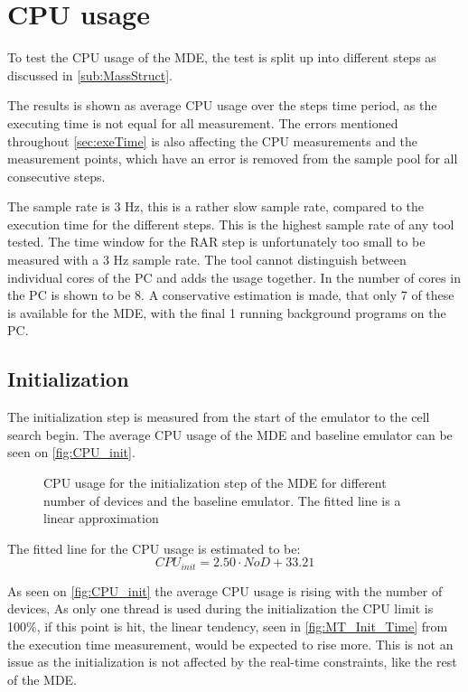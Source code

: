 \section{CPU usage}
To test the CPU usage of the MDE, the test is split up into different steps as discussed in \autoref{sub:MassStruct}. 

The results is shown as average CPU usage over the steps time period, as the executing time is not equal for all measurement. The errors mentioned throughout \autoref{sec:exeTime} is also affecting the CPU measurements and the measurement points, which have an error is removed from the sample pool for all consecutive steps.

The sample rate is 3 Hz, this is a rather slow sample rate, compared to the execution time for the different steps. This is the highest sample rate of any tool tested. The time window for the RAR step is unfortunately too small to be measured with a 3 Hz sample rate. The tool cannot distinguish between individual cores of the PC and adds the usage together. In  the number of cores in the PC is shown to be 8. A conservative estimation is made, that only 7 of these is available for the MDE, with the final 1 running background programs on the PC. 

\subsection{Initialization}
The initialization step is measured from the start of the emulator to the cell search begin. The average CPU usage of the MDE and baseline emulator can be seen on \autoref{fig:CPU_init}.

\begin{figure}[H]
\centering
\resizebox{0.5\textwidth}{!}{
}
\caption{CPU usage for the initialization step of the MDE for different number of devices and the baseline emulator. The fitted line is a linear approximation}
\label{fig:CPU_init}
\end{figure}

The fitted line for the CPU usage is estimated to be:
\begin{equation}
CPU_{init} = 2.50 \cdot NoD + 33.21
\end{equation}

As seen on \autoref{fig:CPU_init} the average CPU usage is rising with the number of devices, As only one thread is used during the initialization the CPU limit is 100\%, if this point is hit, the linear tendency, seen in \autoref{fig:MT_Init_Time} from the execution time measurement, would be expected to rise more. This is not an issue as the initialization is not affected by the real-time constraints, like the rest of the MDE.

